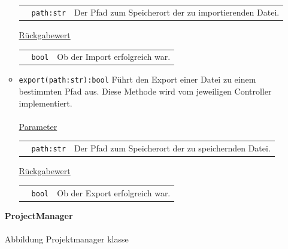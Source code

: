 \documentclass{article}
\begin{document}
\begin{itemize}
\begin{itemize}
\begin{tabular}{lll}
 & \texttt{path:str} & Der Pfad zum Speicherort der zu importierenden Datei. \\
\end{tabular}

\underline{{Rückgabewert}}

\begin{tabular}{lll}
 & \texttt{bool} & Ob der Import erfolgreich war. \\
\end{tabular}


\item \texttt{export(path:str):bool} \newline Führt den Export einer Datei zu einem bestimmten Pfad aus. Diese Methode wird vom jeweiligen Controller implementiert.
\\\\
\underline{{Parameter}}

\begin{tabular}{lll}
 & \texttt{path:str} & Der Pfad zum Speicherort der zu speichernden Datei. \\
\end{tabular}

\underline{{Rückgabewert}}

\begin{tabular}{lll}
 & \texttt{bool} & Ob der Export erfolgreich war. \\
\end{tabular}
\end{itemize}



\newpage
\textbf{\large{ProjectManager}}\\\\

Abbildung Projektmanager klasse\\\\


\end{itemize}
\end{document}
